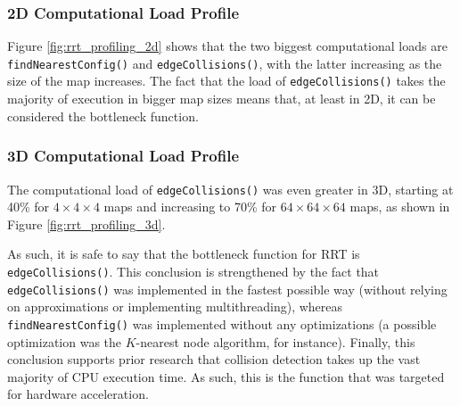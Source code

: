     \subsubsection{2D Computational Load Profile}
        Figure \ref{fig:rrt_profiling_2d} shows that the two biggest computational loads are \texttt{findNearestConfig()} and \texttt{edgeCollisions()}, with the latter increasing as the size of the map increases. The fact that the load of \texttt{edgeCollisions()} takes the majority of execution in bigger map sizes means that, at least in 2D, it can be considered the bottleneck function.

        

    \subsubsection{3D Computational Load Profile}
        The computational load of \texttt{edgeCollisions()} was even greater in 3D, starting at 40\% for $4\times 4\times 4$ maps and increasing to 70\% for $64\times 64\times 64$ maps, as shown in Figure \ref{fig:rrt_profiling_3d}.

        

        As such, it is safe to say that the bottleneck function for \gls{RRT} is \texttt{edgeCollisions()}. This conclusion is strengthened by the fact that \texttt{edgeCollisions()} was implemented in the fastest possible way (without relying on approximations or implementing multithreading), whereas \texttt{findNearestConfig()} was implemented without any optimizations (a possible optimization was the $K$-nearest node algorithm, for instance). Finally, this conclusion supports prior research that collision detection takes up the vast majority of CPU execution time. As such, this is the function that was targeted for hardware acceleration.  
